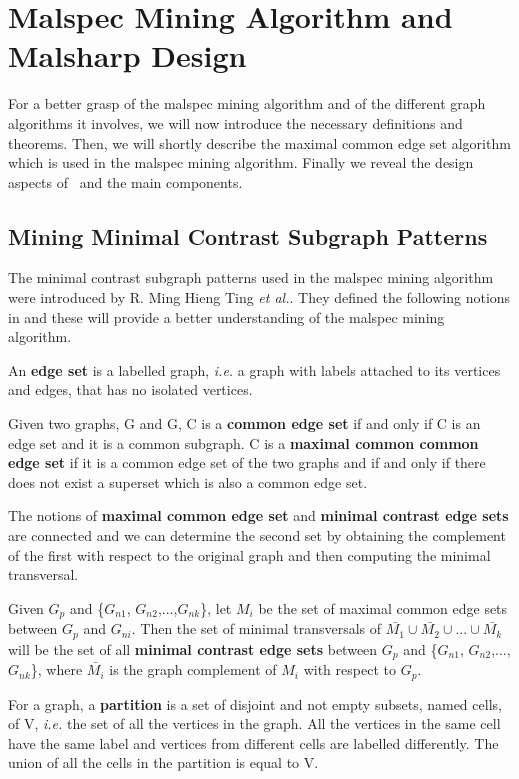 \chapter{Malspec Mining Algorithm and Malsharp Design}
\label{chapter:third}

For a better grasp of the malspec mining algorithm and of the different graph algorithms it involves, we will now introduce the necessary definitions and theorems. Then, we will shortly describe the maximal common edge set algorithm which is used in the malspec mining algorithm. Finally we reveal the design aspects of \project\ and the main components.

\section{Mining Minimal Contrast Subgraph Patterns}
\label{third:graph-defs}

The minimal contrast subgraph patterns used in the malspec mining algorithm were introduced by R. Ming Hieng Ting \textit{et al.}. They defined the following notions in \cite{minimal-contrast-subgraph} and these will provide a better understanding of the malspec mining algorithm.

An \textbf{edge set} is a labelled graph, \textit{i.e.} a graph with labels attached to its vertices and edges, that has no isolated vertices.

Given two graphs, G and G, C is a \textbf{common edge set} if and only if C is an edge set and it is a common subgraph. C is a \textbf{maximal common common edge set} if it is a common edge set of the two graphs and if and only if there does not exist a superset which is also a common edge set.

The notions of \textbf{maximal common edge set} and \textbf{minimal contrast edge sets} are connected and we can determine the second set by obtaining the complement of the first with respect to the original graph and then computing the minimal transversal.

Given $G_{p}$ and \{$G_{n1}$, $G_{n2}$,...,$G_{nk}$\}, let $M_{i}$ be the set of maximal common edge sets between $G_{p}$ and $G_{ni}$. Then the set of minimal transversals of $\bar{M_{1}} \cup \bar{M_{2}} \cup ... \cup \bar{M_{k}}$ will be the set of all \textbf{minimal contrast edge sets} between $G_{p}$ and \{$G_{n1}$, $G_{n2}$,...,$G_{nk}$\}, where $\bar{M_{i}}$ is the graph complement of $M_{i}$ with respect to $G_{p}$.

For a graph, a \textbf{partition} is a set of disjoint and not empty subsets, named cells, of V, \textit{i.e.} the set of all the vertices in the graph. All the vertices in the same cell have the same label and vertices from different cells are labelled differently. The union of all the cells in the partition is equal to V.

